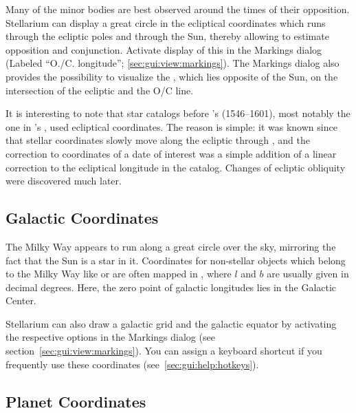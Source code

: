 Many of the minor bodies are best observed around the times of their
opposition.  Stellarium can display a great circle in the ecliptical
coordinates which runs through the ecliptic poles and through the Sun,
thereby allowing to estimate opposition and conjunction. Activate
display of this  in the Markings dialog
(Labeled ``O./C. longitude''; \ref{sec:gui:view:markings}). 
The Markings dialog also provides the possibility to visualize the , which lies opposite of the Sun, on the intersection of the ecliptic and the O/C line.



It is interesting to note that star catalogs before 's 
(1546--1601), most notably the one in 's
, used ecliptical coordinates. The reason is
simple: it was known since  that stellar coordinates
slowly move along the ecliptic through , and the
correction to coordinates of a date of interest was a simple addition
of a linear correction to the ecliptical longitude in the
catalog. Changes of ecliptic obliquity were discovered much later.

\subsection{Galactic Coordinates}
\label{sec:Concepts:Galactic}

The Milky Way appears to run along a great circle over the sky,
mirroring the fact that the Sun is a star in it. Coordinates for
non-stellar objects which belong to the Milky Way like
 or  are often mapped
in , 
where  $l$ and 
 $b$ are usually given in decimal
degrees. Here, the zero point of galactic longitudes lies in the
Galactic Center.

Stellarium can also draw a galactic grid and the galactic equator by
activating the respective options in the Markings dialog (see
section~\ref{sec:gui:view:markings}). You can assign a keyboard
shortcut if you frequently use these coordinates
(see~\ref{sec:gui:help:hotkeys}).


\subsection{Planet Coordinates}
\label{sec:Concepts:PlanetCoordinates}

